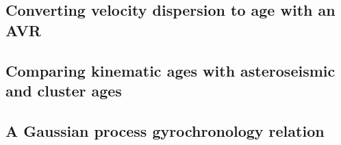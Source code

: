 \subsection{Converting velocity dispersion to age with an AVR}

\subsection{Comparing kinematic ages with asteroseismic and cluster ages}

\subsection{A Gaussian process gyrochronology relation}
